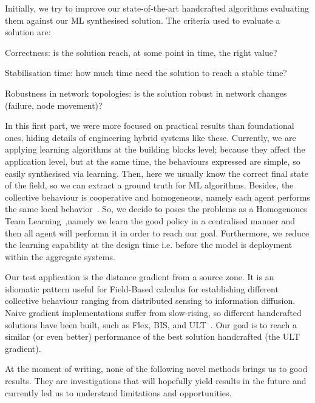 \documentclass[conference]{IEEEtran}
\begin{document}
Initially, we try to improve our state-of-the-art handcrafted algorithms evaluating them against our ML synthesised solution.
%
The criteria used to evaluate a solution are:
\begin{enumerate*}[label=(\roman*)]
    \item Correctness: is the solution reach, at some point in time, the right value?
    \item Stabilisation time: how much time need the solution to reach a stable time?
    \item Robustness in network topologies: is the solution robust in network changes (failure, node movement)?
\end{enumerate*}

In this first part, we were more focused on practical results than foundational ones, hiding details of engineering hybrid systems like these.  
%
Currently, we are applying learning algorithms at the building blocks level; because they affect the application level, but at the same time, the behaviours expressed are simple, so easily synthesised via learning.
%
Then, here we usually know the correct final state of the field, so we can extract a ground truth for ML algorithms.
%
Besides, the collective behaviour is cooperative and homogeneous, namely each agent performs the same local behavior~\cite{DBLP:journals/aamas/PanaitL05}.  %
%
So, we decide to poses the problems as a Homogenoues Team Learning~\cite{DBLP:journals/aamas/PanaitL05},namely we learn the good policy in a centralised manner and then all agent will performn it in order to reach our goal. 
%
Furthermore, we reduce the learning capability at the design time i.e. before the model is deployment within the aggregate systems.

Our test application is the distance gradient from a source zone. %
%
It is an idiomatic pattern useful for Field-Based calculus for establishing different collective behaviour ranging from distributed sensing to information diffusion.
%
Naive gradient implementations suffer from slow-rising, so different handcrafted solutions have been built, such as Flex, BIS, and ULT~\cite{DBLP:conf/saso/AudritoCDV17}.
%
Our goal is to reach a similar (or even better) performance of the best solution handcrafted (the ULT gradient).

At the moment of writing, none of the following novel methods brings us to good results. They are investigations that will hopefully yield results in the future and currently led us to understand limitations and opportunities.
\end{document}
